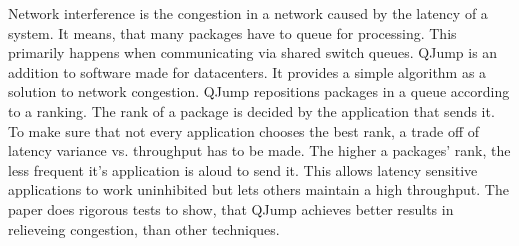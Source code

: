\documentclass[a4paper]{article}
\begin{document}
Network interference is the congestion in a network caused by the latency of a system. It means, that many packages have to queue for processing. This primarily happens when communicating via shared switch queues. QJump is an addition to software made for datacenters. It provides a simple algorithm as a solution to network congestion. QJump repositions packages in a queue according to a ranking. The rank of a package is decided by the application that sends it. To make sure that not every application chooses the best rank, a trade off of latency variance vs. throughput has to be made. The higher a packages' rank, the less frequent it's application is aloud to send it. This allows latency sensitive applications to work uninhibited but lets others maintain a high throughput. The paper does rigorous tests to show, that QJump achieves better results in relieveing congestion, than other techniques.
\end{document}
